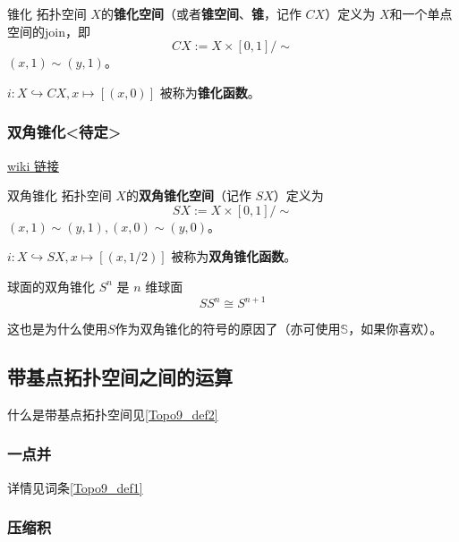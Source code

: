 \begin{definition}{锥化}
拓扑空间 $X$的\textbf{锥化空间}（或者\textbf{锥空间}、\textbf{锥}，记作 $C X$）定义为 $X$和一个单点空间的join，即
\[
    C X := X \times [0,1] / \sim
\]
$(x, 1) \sim (y, 1)$。

$i: X \hookrightarrow C X, x \mapsto [(x, 0)]$ 被称为\textbf{锥化函数}。
\end{definition}


\subsubsection{双角锥化<待定>}

\href{https://en.wikipedia.org/wiki/Suspension_(topology)}{wiki 链接}

\begin{definition}{双角锥化}
拓扑空间 $X$的\textbf{双角锥化空间}（记作 $S X$）定义为
\[
    S X := X \times [0,1] / \sim
\]
$(x, 1) \sim (y, 1), (x, 0) \sim (y, 0)$。

$i: X \hookrightarrow S X, x \mapsto [(x, 1/2)]$ 被称为\textbf{双角锥化函数}。
\end{definition}

\begin{theorem}{球面的双角锥化}
$S^n$ 是 $n$ 维球面
\[
S S^n \cong S^{n+1}
\]
\end{theorem}
这也是为什么使用$S$作为双角锥化的符号的原因了（亦可使用$\mathbb{S}$，如果你喜欢）。


\subsection{带基点拓扑空间之间的运算}

什么是带基点拓扑空间见\autoref{Topo9_def2}~

\subsubsection{一点并}

详情见词条\autoref{Topo9_def1}~


\subsubsection{压缩积}


